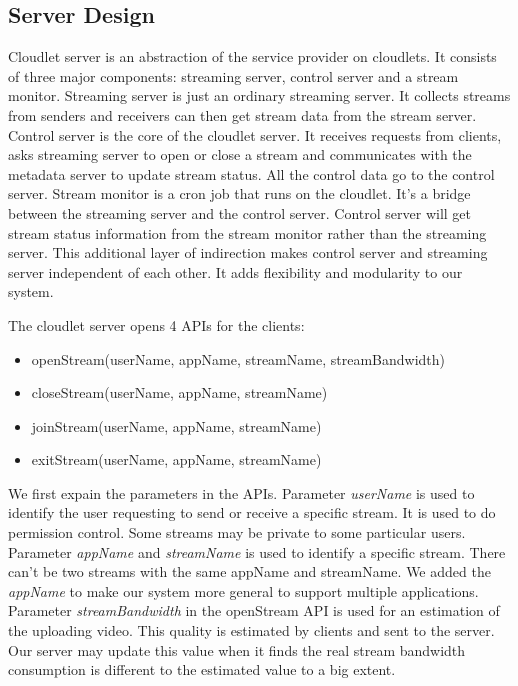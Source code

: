 \documentclass[letterpaper,twocolumn,10pt]{article}
\begin{document}
\subsection{Server Design}
Cloudlet server is an abstraction of the service provider on cloudlets. It consists of three major components: streaming server, control server and a stream monitor. Streaming server is just an ordinary streaming server. It collects streams from senders and receivers can then get stream data from the stream server. Control server is the core of the cloudlet server. It receives requests from clients, asks streaming server to open or close a stream and communicates with the metadata server to update stream status. All the control data go to the control server. Stream monitor is a cron job that runs on the cloudlet. It's a bridge between the streaming server and the control server. Control server will get stream status information from the stream monitor rather than the streaming server. This additional layer of indirection makes control server and streaming server independent of each other. It adds flexibility and modularity to our system.

The cloudlet server opens 4 APIs for the clients:

\begin{itemize}
  \item openStream(userName, appName, streamName, streamBandwidth)
  \item closeStream(userName, appName, streamName)
  \item joinStream(userName, appName, streamName)
  \item exitStream(userName, appName, streamName)
\end{itemize}

We first expain the parameters in the APIs. Parameter \emph{userName} is used to identify the user requesting to send or receive a specific stream. It is used to do permission control. Some streams may be private to some particular users. Parameter \emph{appName} and \emph{streamName} is used to identify a specific stream. There can't be two streams with the same appName and streamName. We added the \emph{appName} to make our system more general to support multiple applications. Parameter \emph{streamBandwidth} in the openStream API is used for an estimation of the uploading video. This quality is estimated by clients and sent to the server. Our server may update this value when it finds the real stream bandwidth consumption is different to the estimated value to a big extent.
\end{document}

